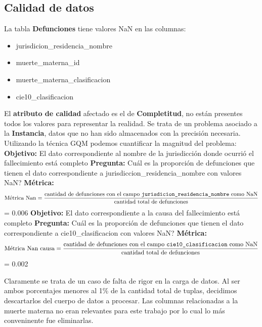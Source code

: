 \documentclass[11pt,a4paper]{article}
\begin{document}
\subsection*{Calidad de datos}
La tabla \textbf{Defunciones} tiene valores NaN en las columnas:
\begin{itemize}
	\item jurisdicion\_residencia\_nombre
	\item muerte\_materna\_id
	\item muerte\_materna\_clasificacion
	\item cie10\_clasificacion	
\end{itemize}
 El \textbf{atributo de calidad} afectado es el de \textbf{Completitud}, no están presentes todos los valores para representar la realidad. Se trata de un problema asociado a la \textbf{Instancia}, datos que no han sido almacenados con la precisión necesaria. 
 \newline
\newline
 Utilizando la técnica GQM podemos cuantificar la magnitud del problema:
 \newline
 \textbf{Objetivo:} El dato correspondiente al nombre de la jurisdicción donde ocurrió el fallecimiento está completo
 \newline
 \textbf{Pregunta:} Cuál es la proporción de defunciones que tienen el dato correspondiente a jurisdiccion\_residencia\_nombre con valores NaN?
 \newline
 \textbf{Métrica:} \[
 \text{Métrica Nan} = \frac{\text{cantidad de defunciones con el campo \texttt{jurisdicion\_residencia\_nombre} como NaN}}{\text{cantidad total de defunciones}}
 \]
  = 0.006
 \newline
 \newline
 \textbf{Objetivo:} El dato correspondiente a la causa del fallecimiento está completo
 \newline
 \textbf{Pregunta:} Cuál es la proporción de defunciones que tienen el dato correspondiente a cie10\_clasificacion con valores NaN?
 \newline
 \textbf{Métrica:} \[
 \text{Métrica Nan causa} = \frac{\text{cantidad de defunciones con el campo \texttt{cie10\_clasificacion} como NaN}}{\text{cantidad total de defunciones}}
 \]
  = 0.002
 \newline
 
 \qquad Claramente se trata de un caso de falta de rigor en la carga de datos. Al ser ambos porcentajes menores al 1\% de la cantidad total de tuplas, decidimos descartarlos del cuerpo de datos a procesar. Las columnas relacionadas a la muerte materna no eran relevantes para este trabajo por lo cual lo más conveninente fue eliminarlas. 
\end{document}
